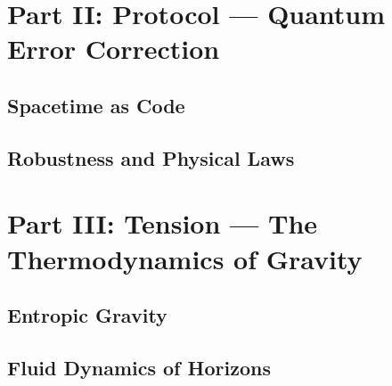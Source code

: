 \documentclass[11pt,a4paper,twoside]{book}
\begin{document}
\part{Part II: Protocol --- Quantum Error Correction}


\chapter{Spacetime as Code}




\chapter{Robustness and Physical Laws}




\part{Part III: Tension --- The Thermodynamics of Gravity}


\chapter{Entropic Gravity}




\chapter{Fluid Dynamics of Horizons}



\end{document}
